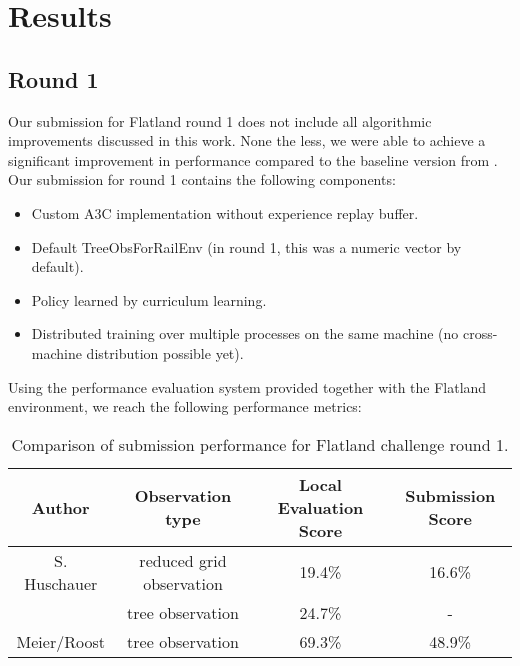 %
%

\chapter{Results}\label{chap.resultate}
\section{Round 1}
Our submission for Flatland round 1 does not include all algorithmic improvements discussed in this work. None the less, we were able to achieve a significant improvement in performance compared to the baseline version from \cite{flatlandstephan}.
Our submission for round 1 contains the following components:
\begin{itemize}
	\item Custom A3C implementation without experience replay buffer.
	\item Default TreeObsForRailEnv (in round 1, this was a numeric vector by default).
	\item Policy learned by curriculum learning.
	\item Distributed training over multiple processes on the same machine (no cross-machine distribution possible yet).
\end{itemize}
Using the performance evaluation system provided together with the Flatland environment, we reach the following performance metrics:
\begin{table}[H]
	\centering
	\begin{tabular}{ |c|c|c|c| } 
		\hline
		\textbf{Author} & \textbf{Observation type} & \textbf{Local Evaluation Score} & \textbf{Submission Score} \\
		\hline
		S. Huschauer & reduced grid observation & 19.4\% & 16.6\% \\
		& tree observation & 24.7\% & - \\
		Meier/Roost & tree observation & 69.3\% & 48.9\% \\
		\hline
	\end{tabular}
	\caption{Comparison of submission performance for Flatland challenge round 1.}
	\label{table:results_round1}
\end{table}
